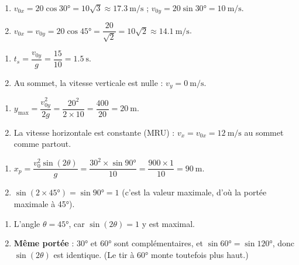 \documentclass[11pt,a4paper]{article}
\begin{document}

\begin{corrige}
\begin{enumerate}[label=\alph*)]
  \item $v_{0x}=20\cos\ang{30}=10\sqrt3\approx\qty{17,3}{\metre\per\second}$ ; $v_{0y}=20\sin\ang{30}=\qty{10}{\metre\per\second}$.
  \item $v_{0x}=v_{0y}=20\cos\ang{45}=\dfrac{20}{\sqrt2}=10\sqrt2\approx\qty{14,1}{\metre\per\second}$.
\end{enumerate}
\end{corrige}

\begin{corrige}
\begin{enumerate}[label=\alph*)]
  \item $t_s=\dfrac{v_{0y}}{g}=\dfrac{15}{10}=\qty{1,5}{\second}$.
  \item Au sommet, la vitesse verticale est nulle : $v_y=\qty{0}{\metre\per\second}$.
\end{enumerate}
\end{corrige}

\begin{corrige}
\begin{enumerate}[label=\alph*)]
  \item $y_{\max}=\dfrac{v_{0y}^2}{2g}=\dfrac{20^2}{2\times10}=\dfrac{400}{20}=\qty{20}{\metre}$.
  \item La vitesse horizontale est constante (MRU) : $v_x=v_{0x}=\qty{12}{\metre\per\second}$ au sommet comme partout.
\end{enumerate}
\end{corrige}

\begin{corrige}
\begin{enumerate}[label=\alph*)]
  \item $x_p=\dfrac{v_0^2\sin(2\theta)}{g}=\dfrac{30^2\times\sin\ang{90}}{10}=\dfrac{900\times1}{10}=\qty{90}{\metre}$.
  \item $\sin(2\times\ang{45})=\sin\ang{90}=1$ (c'est la valeur maximale, d'où la portée maximale à \ang{45}).
\end{enumerate}
\end{corrige}

\begin{corrige}
\begin{enumerate}[label=\alph*)]
  \item L'angle $\theta=\ang{45}$, car $\sin(2\theta)=1$ y est maximal.
  \item \textbf{Même portée} : \ang{30} et \ang{60} sont complémentaires, et $\sin\ang{60}=\sin\ang{120}$, donc $\sin(2\theta)$ est identique. (Le tir à \ang{60} monte toutefois plus haut.)
\end{enumerate}
\end{corrige}
\end{document}
